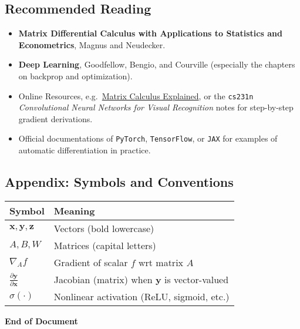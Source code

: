\documentclass[11pt]{article}
\begin{document}
\subsection*{Recommended Reading}
\begin{itemize}[leftmargin=2em]
    \item \textbf{Matrix Differential Calculus with Applications to Statistics and Econometrics}, Magnus and Neudecker.
    \item \textbf{Deep Learning}, Goodfellow, Bengio, and Courville 
    (especially the chapters on backprop and optimization).
    \item Online Resources, e.g.\ 
    \href{https://explained.ai/matrix-calculus/}{Matrix Calculus Explained}, 
    or the \texttt{cs231n} \emph{Convolutional Neural Networks for Visual Recognition} notes 
    for step-by-step gradient derivations.
    \item Official documentations of \texttt{PyTorch}, \texttt{TensorFlow}, or \texttt{JAX} 
    for examples of automatic differentiation in practice.
\end{itemize}

\subsection*{Appendix: Symbols and Conventions}
\begin{table}[h]
\centering
\begin{tabular}{ll}
\toprule
\textbf{Symbol} & \textbf{Meaning} \\
\midrule
$\mathbf{x}, \mathbf{y}, \mathbf{z}$ & Vectors (bold lowercase) \\
$A, B, W$ & Matrices (capital letters) \\
$\nabla_A f$ & Gradient of scalar $f$ wrt matrix $A$ \\
$\frac{\partial \mathbf{y}}{\partial \mathbf{x}}$ & Jacobian (matrix) when $\mathbf{y}$ is vector-valued \\
$\sigma(\cdot)$ & Nonlinear activation (ReLU, sigmoid, etc.) \\
\bottomrule
\end{tabular}
\end{table}

\vfill

\begin{center}
\textbf{End of Document}
\end{center}
\end{document}
